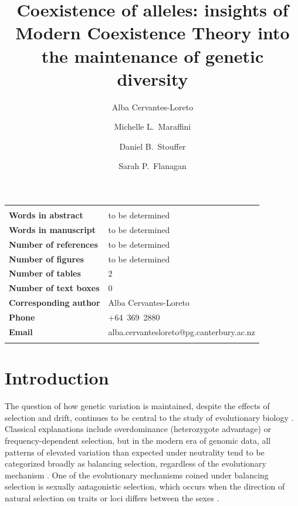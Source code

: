 \documentclass[12pt]{article}
\title{Coexistence of alleles: insights of Modern Coexistence Theory into the maintenance of genetic diversity}
\author[1]{Alba Cervantes-Loreto}
\author[1]{Michelle L.\ Maraffini}
\author[1]{Daniel B.\ Stouffer}
\author[1]{Sarah P.\ Flanagan}
\affil[1]{Centre for Integrative Ecology, School of Biological Sciences\\ University of Canterbury, Christchurch 8140, New Zealand}
\date{}
\newenvironment{ecolettcover}{\maketitle}{\clearpage}
\begin{document}
\linenumbers
\baselineskip30pt
\maketitle

\begin{ecolettcover}

\begin{center}
\begin{tabular}{ll}
\hline \\

\bf{Words in abstract}         & to be determined \\
\bf{Words in manuscript}       & to be determined\\
\bf{Number of references}      & to be determined  \\
\bf{Number of figures}			& to be determined \\
\bf{Number of tables} 			& 2 \\
\bf{Number of text boxes}		& 0 \\
\bf{Corresponding author}      & Alba Cervantes-Loreto \\
\bf{Phone}                     & +64~369~2880 \\

\bf{Email}                     & alba.cervantesloreto@pg.canterbury.ac.nz \\
                                                                        \\
\hline
\end{tabular}
\end{center}

\maketitle

\end{ecolettcover}
\section{Introduction}
The question of how genetic variation is maintained, despite the effects of selection and drift, continues to be central to the study of evolutionary biology \citep{walsh_evolution_2018}. Classical explanations include overdominance (heterozygote advantage) or frequency-dependent selection, but in the modern era of genomic data, all patterns of elevated variation than expected under neutrality tend to be categorized broadly as balancing selection, regardless of the evolutionary mechanism \citep{mitchell-olds_which_2007}.  One of the evolutionary mechanisms coined under balancing selection is sexually antagonistic selection, which occurs when the direction of natural selection on traits or loci differs between the sexes \citep{connallon2018environmental}.
\end{document}
